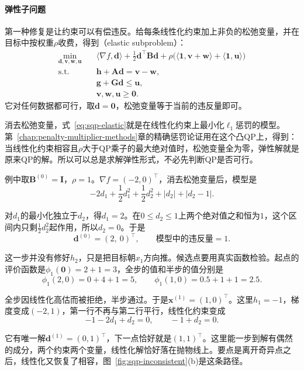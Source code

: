 \paragraph{弹性子问题}
第一种修复是让约束可以有偿违反。给每条线性化约束加上非负的松弛变量，并在目标中按权重$\rho$收费，得到（elastic subproblem）：
\begin{equation}
 \begin{aligned}
 \min_{\bm{d},\bm{v},\bm{w},\bm{u}}\quad & \langle\nabla f,\bm{d}\rangle+\frac12\bm{d}^\top\bm{B}\bm{d}
 +\rho\bigl(\langle\bm{1},\bm{v}+\bm{w}\rangle+\langle\bm{1},\bm{u}\rangle\bigr)\\
 \text{s.t.}\quad & \bm{h}+\bm{A}\bm{d}=\bm{v}-\bm{w},\\
 & \bm{g}+\bm{G}\bm{d}\leq\bm{u},\\
 & \bm{v},\bm{w},\bm{u}\geq\bm{0}.
 \end{aligned}
 \label{eq:sqp-elastic}
\end{equation}
它对任何数据都可行，取$\bm{d}=\bm{0}$，松弛变量等于当前的违反量即可。

消去松弛变量，式~\eqref{eq:sqp-elastic}就是在线性化约束上最小化$\ell_1$惩罚的模型。第~\ref{chap:penalty-multiplier-methods}章的精确惩罚论证用在这个凸QP上，得到：当线性化约束相容且$\rho$大于QP乘子的最大绝对值时，松弛变量全为零，弹性解就是原来QP的解。所以可以总是求解弹性形式，不必先判断QP是否可行。

例中取$\bm{B}^{(0)}=\bm{I}$，$\rho=1$。$\nabla f=(-2,0)^\top$，消去松弛变量后，模型是
\[
 -2d_1+\frac12d_1^2+\frac12d_2^2+\lvert d_2\rvert+\lvert d_2-1\rvert.
\]

对$d_1$的最小化独立于$d_2$，得$d_1=2$。在$0\leq d_2\leq1$上两个绝对值之和恒为$1$，这个区间内只剩$\frac12d_2^2$起作用，所以$d_2=0$。于是
\[
 \bm{d}^{(0)}=(2,\ 0)^\top,\qquad\text{模型中的违反量}=1.
\]

这一步并没有修好$h_2$，只是把目标朝$x_1$方向推。候选点要用真实函数检验。起点的评价函数是$\phi_1(\bm{0})=2+1=3$，全步的值和半步的值分别是
\[
 \phi_1(2,0)=0+4+1=5,\qquad\phi_1(1,0)=0.5+1+1=2.5.
\]

全步因线性化高估而被拒绝，半步通过。于是$\bm{x}^{(1)}=(1,0)^\top$。这里$h_1=-1$，梯度变成$(-2,1)$，第一行不再与第二行平行，线性化约束变成
\[
 -1-2d_1+d_2=0,\qquad-1+d_2=0.
\]

它有唯一解$\bm{d}^{(1)}=(0,1)^\top$，下一点恰好就是$(1,1)^\top$。这里能一步到解有偶然的成分，两个约束两个变量，线性化解恰好落在抛物线上。要点是离开奇异点之后，线性化又恢复了相容，图~\ref{fig:sqp-inconsistent}(b)是这条路径。

